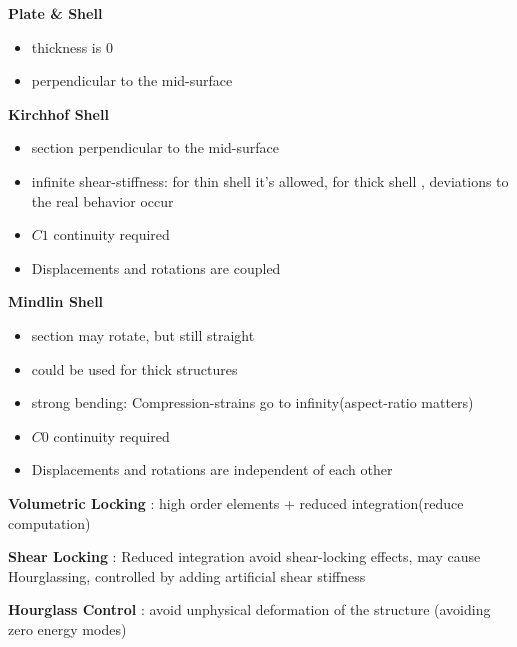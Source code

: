 \documentclass[landscape,a0paper,fontscale=0.285]{baposter} %
\newcommand{\compresslist}{ %
\setlength{\itemsep}{1pt}
\setlength{\parskip}{0pt}
\setlength{\parsep}{0pt}
}
\begin{document}
\begin{poster}
{\textbf{Plate \& Shell}\vspace{-0.3cm}
\begin{itemize}\compresslist
    \item thickness is $0$
    \item perpendicular to the mid-surface
\end{itemize}
\vspace{-0.3cm}


\textbf{Kirchhof Shell}\vspace{-0.3cm}
 \begin{itemize}\compresslist
     \item  section perpendicular to the mid-surface
     \item infinite shear-stiffness:
for thin shell it's allowed,
for thick shell , deviations
to the real behavior occur 
    \item $C1$ continuity required
    \item Displacements and rotations are coupled
 \end{itemize}

\vspace{-0.3cm}

\textbf{Mindlin Shell}\vspace{-0.3cm}
\begin{itemize}\compresslist
    \item section may rotate, but still straight
    \item could be used for thick structures
    \item strong bending: Compression-strains go to infinity(aspect-ratio matters)
    \item $C0$ continuity required
    \item Displacements and rotations are independent of each other
\end{itemize}

\vspace{-0.3cm}


\colorbox[HTML]{CCFFFF}{}

\textbf{Volumetric Locking}
:
high order elements + reduced integration(reduce computation)

\textbf{Shear Locking}
:
Reduced integration avoid shear-locking effects,  may cause Hourglassing, controlled by adding artificial shear stiffness

\textbf{Hourglass Control}
:
avoid unphysical deformation of the structure (avoiding zero
energy modes)

}
\end{poster}
\end{document}
